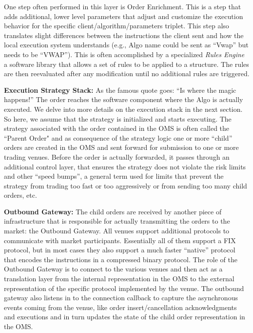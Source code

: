 One step often performed in this layer is Order Enrichment. This is a step that adds additional, lower level parameters that adjust and customize the execution behavior for the specific client/algorithm/parameters triplet. This step also translates slight differences between the instructions the client sent and how the local execution system understands (e.g., Algo name could be sent as ``Vwap'' but needs to be ``VWAP''). This is often accomplished by a specialized \emph{Rules Engine} a software library that allows a set of rules to be applied to a structure. The rules are then reevaluated after any modification until no additional rules are triggered. \twomedskip


\noindent\textbf{Execution Strategy Stack:} As the famous quote goes: ``Is where the magic happens!'' The order reaches the software component where the Algo is actually executed. We delve into more details on the execution stack in the next section. So here, we assume that the strategy is initialized and starts executing. The strategy associated with the order contained in the OMS is often called the ``Parent Order" and as consequence of the strategy logic one or more ``child'' orders  are created in the OMS and sent forward for submission to one or more trading venues. Before the order is actually forwarded, it passes through an additional control layer, that ensures the strategy does not violate the risk limits and other ``speed bumps'', a general term used for limits that prevent the strategy from trading too fast or too aggressively or from sending too many child orders, etc. \twomedskip


\noindent\textbf{Outbound Gateway:} The child orders are received by another piece of infrastructure that is responsible for actually transmitting the orders to the market: the Outbound Gateway. All venues support additional protocols to communicate with market participants. Essentially all of them support a FIX protocol, but in most cases they also support a much faster ``native'' protocol that encodes the instructions in a compressed binary protocol. The role of the Outbound Gateway is to connect to the various venues and then act as a translation layer from the internal representation in the OMS to the external representation of the specific protocol implemented by the venue. The outbound gateway also listens in to the connection callback to capture the asynchronous events coming from the venue, like order insert/cancellation acknowledgments and executions and in turn updates the state of the child order representation in the OMS. \twomedskip


